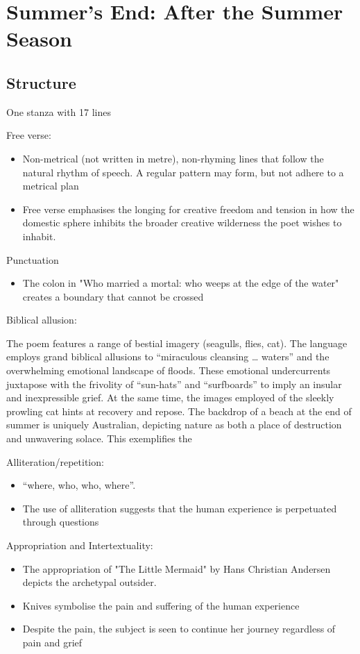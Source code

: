 \section{Summer's End: After the Summer Season} \label{13/11/2024}
	\subsection{Structure}
		One stanza with 17 lines

		Free verse:
		\begin{itemize}
			\item Non-metrical (not written in metre), non-rhyming lines that follow the natural rhythm of speech. A regular pattern may form, but not adhere to a metrical plan
			\item Free verse emphasises the longing for creative freedom and tension in how the domestic sphere inhibits the broader creative wilderness the poet wishes to inhabit.
		\end{itemize}

		Punctuation
		\begin{itemize}
			\item The colon in "Who married a mortal: who weeps at the edge of the water" creates a boundary that cannot be crossed
		\end{itemize}

		Biblical allusion:

			\subitem The poem features a range of bestial imagery (seagulls, flies, cat). The language employs grand biblical allusions to “miraculous cleansing … waters” and the overwhelming emotional landscape of floods. These emotional undercurrents juxtapose with the frivolity of “sun-hats” and “surfboards” to imply an insular and inexpressible grief. At the same time, the images employed of the sleekly prowling cat hints at recovery and repose. The backdrop of a beach at the end of summer is uniquely Australian, depicting nature as both a place of destruction and unwavering solace. This exemplifies the 

		Alliteration/repetition:
		\begin{itemize}
			\item “where, who, who, where”.
			\item The use of alliteration suggests that the human experience is perpetuated through questions
		\end{itemize}
		
		Appropriation and Intertextuality:
		\begin{itemize}
			\item The appropriation of "The Little Mermaid" by Hans Christian Andersen depicts the archetypal outsider.
			\item Knives symbolise the pain and suffering of the human experience
			\item Despite the pain, the subject is seen to continue her journey regardless of pain and grief
		\end{itemize}
	

